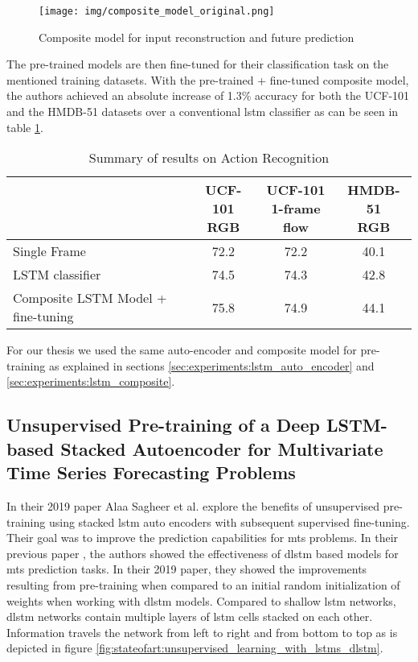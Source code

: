 \begin{figure}[h]
	\centering
	\texttt{[image: img/composite\_model\_original.png]}
	\caption{Composite model for input reconstruction and future prediction \cite{unsupervised_learning_lstms}}
	\label{fig:stateofart:unsupervised_lstm_composite}
\end{figure}

The pre-trained models are then fine-tuned for their classification task on the mentioned training datasets. With the pre-trained + fine-tuned composite model, the authors achieved an absolute increase of 1.3\% accuracy for both the UCF-101 and the HMDB-51 datasets over a conventional \gls{lstm} classifier as can be seen in table \ref{table:stateofart:unsupervised_learning_results}.

\begin{table}[]
	\centering
	\begin{tabular}{l c c c}
		\thead{Model} & \thead{UCF-101 \\ RGB} & \thead{UCF-101
\\ 1-frame flow} & \thead{HMDB-51 \\
RGB} \\ \hline
		\midrule
		Single Frame & 72.2 & 72.2 & 40.1 \\
		\midrule
		LSTM classifier & 74.5 & 74.3 & 42.8 \\
		\midrule
		Composite LSTM
Model + fine-tuning & 75.8 & 74.9 & 44.1 \\
	\end{tabular}
	\caption{Summary of results on Action Recognition \cite{unsupervised_learning_lstms}}
	\label{table:stateofart:unsupervised_learning_results}
\end{table}

For our thesis we used the same auto-encoder and composite model for pre-training as explained in sections \ref{sec:experiments:lstm_auto_encoder} and \ref{sec:experiments:lstm_composite}.

\subsection{Unsupervised Pre-training of a Deep LSTM-based Stacked Autoencoder for Multivariate Time Series Forecasting Problems} \label{sec:stateofart:unsupervised_learning_lstms_timeseries}

In their 2019 paper \cite{unsupervised_learning_lstms_timeseries} Alaa Sagheer et al. explore the benefits of unsupervised pre-training using stacked \gls{lstm} auto encoders with subsequent supervised fine-tuning. Their goal was to improve the prediction capabilities for \gls{mts} problems. In their previous paper \cite{dlstm_time_series_forecasting}, the authors showed the effectiveness of \gls{dlstm} based models for \gls{mts} prediction tasks. In their 2019 paper, they showed the improvements resulting from pre-training when compared to an initial random initialization of weights when working with \gls{dlstm} models. Compared to shallow \gls{lstm} networks, \gls{dlstm} networks contain multiple layers of \gls{lstm} cells stacked on each other. Information travels the network from left to right and from bottom to top as is depicted in figure \ref{fig:stateofart:unsupervised_learning_with_lstms_dlstm}. 

